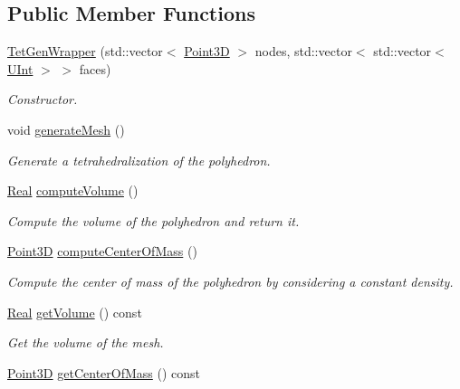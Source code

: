 \subsection*{Public Member Functions}
\begin{DoxyCompactItemize}
\item 
\hyperlink{classFVCode3D_1_1TetGenWrapper_adf67f9b1994b718a65f36724d42e65b0}{Tet\+Gen\+Wrapper} (std\+::vector$<$ \hyperlink{classFVCode3D_1_1Point3D}{Point3D} $>$ nodes, std\+::vector$<$ std\+::vector$<$ \hyperlink{namespaceFVCode3D_a4bf7e328c75d0fd504050d040ebe9eda}{U\+Int} $>$ $>$ faces)
\begin{DoxyCompactList}\small\item\em Constructor. \end{DoxyCompactList}\item 
void \hyperlink{classFVCode3D_1_1TetGenWrapper_ad2965002885016bd26494629af54ce97}{generate\+Mesh} ()
\begin{DoxyCompactList}\small\item\em Generate a tetrahedralization of the polyhedron. \end{DoxyCompactList}\item 
\hyperlink{namespaceFVCode3D_a40c1f5588a248569d80aa5f867080e83}{Real} \hyperlink{classFVCode3D_1_1TetGenWrapper_a519cb27415baac338386403c46af7b08}{compute\+Volume} ()
\begin{DoxyCompactList}\small\item\em Compute the volume of the polyhedron and return it. \end{DoxyCompactList}\item 
\hyperlink{classFVCode3D_1_1Point3D}{Point3D} \hyperlink{classFVCode3D_1_1TetGenWrapper_ad3574fde5de1292dc9064d717a3ee353}{compute\+Center\+Of\+Mass} ()
\begin{DoxyCompactList}\small\item\em Compute the center of mass of the polyhedron by considering a constant density. \end{DoxyCompactList}\item 
\hyperlink{namespaceFVCode3D_a40c1f5588a248569d80aa5f867080e83}{Real} \hyperlink{classFVCode3D_1_1TetGenWrapper_a5ac70d60ce38892615e0561b161c8401}{get\+Volume} () const 
\begin{DoxyCompactList}\small\item\em Get the volume of the mesh. \end{DoxyCompactList}\item 
\hyperlink{classFVCode3D_1_1Point3D}{Point3D} \hyperlink{classFVCode3D_1_1TetGenWrapper_a7e6a7df9467ab825a92f7cafae7934f4}{get\+Center\+Of\+Mass} () const 

\end{DoxyCompactItemize}
